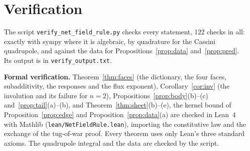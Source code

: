 \documentclass[twocolumn]{iopjournal}
\theoremstyle{definition}
\theoremstyle{remark}
\begin{document}
\section*{Verification}

The script \texttt{verify\_net\_field\_rule.py} checks every statement,
122 checks in all: exactly with sympy where it is algebraic, by
quadrature for the Cassini quadrupole, and against the data for
Propositions~\ref{prop:data} and~\ref{prop:pred}. Its output is in
\texttt{verify\_output.txt}.

\textbf{Formal verification.} Theorem~\ref{thm:faces} (the dictionary,
the four faces, subadditivity, the responses and the flux exponent),
Corollary~\ref{cor:inv} (the involution and its failure for $n = 2$),
Propositions~\ref{prop:body}(b)--(c) and~\ref{prop:tail}(a)--(b), and
Theorem~\ref{thm:sheet}(b)--(e), the kernel bound of
Proposition~\ref{prop:edge} and Proposition~\ref{prop:data}(a) are checked in Lean~4 with Mathlib
(\texttt{lean/NetFieldRule.lean}), importing the constitutive law and the
exchange of the tug-of-war proof. Every theorem uses only Lean's three
standard axioms. The quadrupole integral and the data are checked by the
script.
\end{document}
